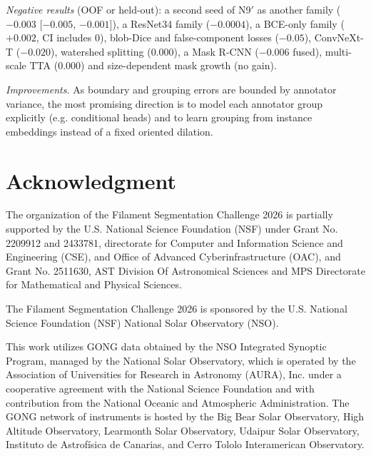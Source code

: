 \documentclass[sigconf]{acmart}
\begin{document}
\emph{Negative results} (OOF or held-out): a second seed of N9$'$ as another family ($-0.003$ [$-0.005$, $-0.001$]), a ResNet34 family ($-0.0004$), a BCE-only family ($+0.002$, CI includes 0), blob-Dice and false-component losses ($-0.05$), ConvNeXt-T ($-0.020$), watershed splitting ($0.000$), a Mask R-CNN ($-0.006$ fused), multi-scale TTA ($0.000$) and size-dependent mask growth (no gain).

\emph{Improvements.} As boundary and grouping errors are bounded by annotator variance, the most promising direction is to model each annotator group explicitly (e.g. conditional heads) and to learn grouping from instance embeddings instead of a fixed oriented dilation.

\section{Acknowledgment}\label{sec:acknowledgment}
    The organization of the Filament Segmentation Challenge 2026 is partially supported by the U.S. National Science Foundation (NSF) under Grant No. 2209912 and 2433781, directorate for Computer and Information Science and Engineering (CSE), and Office of Advanced Cyberinfrastructure (OAC), and Grant No. 2511630, AST Division Of Astronomical Sciences and MPS Directorate for Mathematical and Physical Sciences.

    The Filament Segmentation Challenge 2026 is sponsored by the U.S. National Science Foundation (NSF) National Solar Observatory (NSO).

    This work utilizes GONG data obtained by the NSO Integrated Synoptic Program, managed by the National Solar Observatory, which is operated by the Association of Universities for Research in Astronomy (AURA), Inc. under a cooperative agreement with the National Science Foundation and with contribution from the National Oceanic and Atmospheric Administration. The GONG network of instruments is hosted by the Big Bear Solar Observatory, High Altitude Observatory, Learmonth Solar Observatory, Udaipur Solar Observatory, Instituto de Astrofísica de Canarias, and Cerro Tololo Interamerican Observatory.



\end{document}
